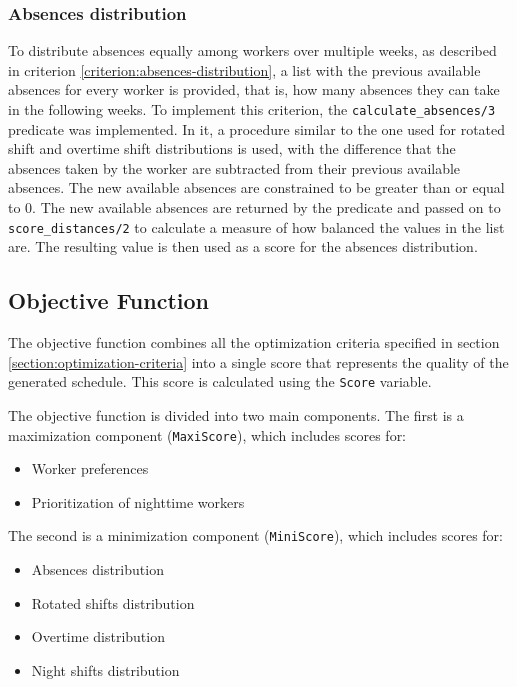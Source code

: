 \documentclass[conference]{IEEEtran}
\def\constraint#1{\vspace{4pt} {#1}}
\begin{document}
\constraint {
    \subsubsection*{Absences distribution}
    To distribute absences equally among workers over multiple weeks, as described in criterion \ref{criterion:absences-distribution}, a list with the previous available absences for every worker is provided, that is, how many absences they can take in the following weeks.
    To implement this criterion, the \texttt{calculate\_absences/3} predicate was implemented. In it, a procedure similar to the one used for rotated shift and overtime shift distributions is used, with the difference that the absences taken by the worker are subtracted from their previous available absences. The new available absences are constrained to be greater than or equal to 0. The new available absences are returned by the predicate and passed on to \texttt{score\_distances/2} to calculate a measure of how balanced the values in the list are. The resulting value is then used as a score for the absences distribution.
}

\subsection{Objective Function}
\label{section:objective-function}

The objective function combines all the optimization criteria specified in section \ref{section:optimization-criteria} into a single score that represents the quality of the generated schedule. This score is calculated using the \texttt{Score} variable.

The objective function is divided into two main components.
The first is a maximization component (\texttt{MaxiScore}), which includes scores for:

\begin{itemize}
    \item Worker preferences
    \item Prioritization of nighttime workers
\end{itemize}

The second is a minimization component (\texttt{MiniScore}), which includes scores for:

\begin{itemize}
    \item Absences distribution 
    \item Rotated shifts distribution
    \item Overtime distribution
    \item Night shifts distribution
\end{itemize}
\end{document}
